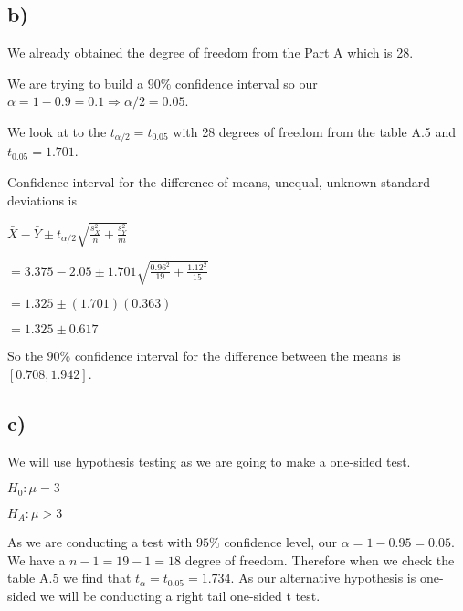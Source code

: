 \documentclass[12pt]{article}
\begin{document}
\subsection*{b)}
We already obtained the degree of freedom from the Part A which is 28.\par 
We are trying to build a $90\%$ confidence interval so our $\alpha = 1 - 0.9 = 0.1 \Rightarrow \alpha / 2 = 0.05$.\par 
We look at to the $t_{\alpha / 2} = t_{0.05}$ with 28 degrees of freedom from the table A.5 and $t_{0.05} = 1.701$.\par 
Confidence interval for the difference of means, unequal, unknown standard deviations is \par $\bar{X} - \bar{Y} \pm t_{\alpha / 2} \sqrt{\frac{s_X^2}{n} + \frac{s_Y^2}{m}}$\\ \par 
$= 3.375 - 2.05 \pm 1.701 \sqrt{\frac{0.96^2}{19} + \frac{1.12^2}{15}}$\\ \par 
$=1.325 \pm (1.701)(0.363)$\\ \par
$=1.325 \pm 0.617$\\ \par 
So the $90 \%$ confidence interval for the difference between the means is $\left[ 0.708, 1.942 \right]$.

\subsection*{c)}
We will use hypothesis testing as we are going to make a one-sided test.\par
$H_0 : \mu = 3$\par 
$H_A : \mu > 3$\par 
As we are conducting a test with $95 \%$ confidence level, our $\alpha = 1 - 0.95 = 0.05$. We have a $n-1 = 19-1 = 18$ degree of freedom. Therefore when we check the table A.5 we find that $t_\alpha = t_{0.05} = 1.734$. As our alternative hypothesis is one-sided we will be conducting a right tail one-sided t test.\\ \par
{}
\end{document}
